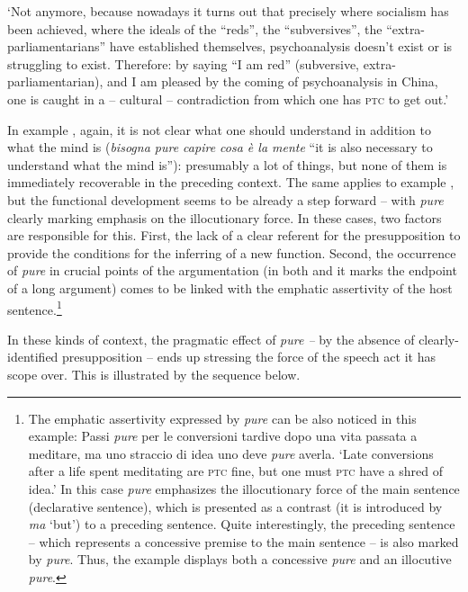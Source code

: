 \glt ‘Not anymore, because nowadays it turns out that precisely where socialism has been achieved, where the ideals of the “reds”, the “subversives”, the “extra-parliamentarians” have established themselves, psychoanalysis doesn’t exist or is struggling to exist. Therefore: by saying “I am red” (subversive, extra-parliamentarian), and I am pleased by the coming of psychoanalysis in China, one is caught in a – cultural – contradiction from which one has \textsc{ptc} to get out.’
    \z

In example , again, it is not clear what one should understand in addition to what the mind is (\textit{bisogna pure capire cosa è la mente} “it is also necessary to understand what the mind is”): presumably a lot of things, but none of them is immediately recoverable in the preceding context. The same applies to example , but the functional development seems to be already a step forward – with \textit{pure} clearly marking emphasis on the illocutionary force. In these cases, two factors are responsible for this. First, the lack of a clear referent for the presupposition to provide the conditions for the inferring of a new function. Second, the occurrence of \textit{pure} in crucial points of the argumentation (in both  and  it marks the endpoint of a long argument) comes to be linked with the emphatic assertivity of the host sentence.\footnote{The emphatic assertivity expressed by \textit{pure} can be also noticed in this example: 
\ea 
Passi \textit{pure} per le conversioni tardive dopo una vita passata a meditare, ma uno straccio di idea uno deve \textit{pure} averla. 
\glt‘Late conversions after a life spent meditating are \textsc{ptc}\textbf{ }fine, but one must \textsc{ptc} have a shred of idea.’
\z
In this case \textit{pure} emphasizes the illocutionary force of the main sentence (declarative sentence), which is presented as a contrast (it is introduced by \textit{ma} ‘but’) to a preceding sentence. Quite interestingly, the preceding sentence – which represents a concessive premise to the main sentence – is also marked by \textit{pure}. Thus, the example displays both a concessive \textit{pure} and an illocutive \textit{pure}.}

In these kinds of context, the pragmatic effect of \textit{pure –} by the absence of clearly-identified presupposition – ends up stressing the force of the speech act it has scope over. This is illustrated by the sequence below.

\ea%
    \label{ex:key:48}

